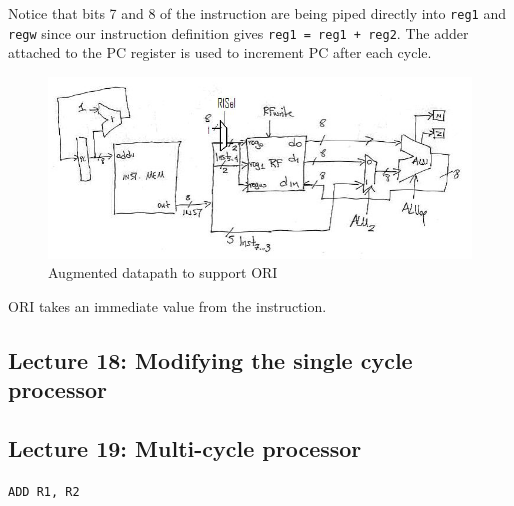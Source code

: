 \documentclass[../notes.tex]{subfiles}
\begin{document}
Notice that bits 7 and 8 of the instruction are being piped directly into \texttt{reg1} and \texttt{regw} since our instruction definition gives \texttt{reg1 = reg1 + reg2}. The adder attached to the PC register is used to increment PC after each cycle.


\begin{figure}[H]
	\centering
	\includegraphics[width=0.8\linewidth]{img/image_2022-12-10-16-34-47.png}
	\caption{Augmented datapath to support ORI}
\end{figure}

ORI takes an immediate value from the instruction.




\subsection{Lecture 18: Modifying the single cycle processor}
\subsection{Lecture 19: Multi-cycle processor}


\texttt{ADD R1, R2}
\end{document}
